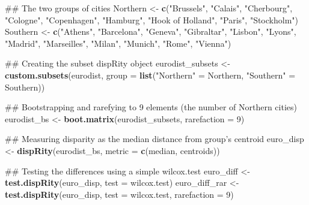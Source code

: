 \documentclass[]{book}
\newenvironment{Shaded}{\begin{snugshade}}{\end{snugshade}}
\newcommand{\KeywordTok}[1]{\textcolor[rgb]{0.13,0.29,0.53}{\textbf{#1}}}
\newcommand{\DataTypeTok}[1]{\textcolor[rgb]{0.13,0.29,0.53}{#1}}
\newcommand{\DecValTok}[1]{\textcolor[rgb]{0.00,0.00,0.81}{#1}}
\newcommand{\StringTok}[1]{\textcolor[rgb]{0.31,0.60,0.02}{#1}}
\newcommand{\NormalTok}[1]{#1}
\theoremstyle{definition}
\theoremstyle{definition}
\theoremstyle{definition}
\theoremstyle{remark}
\begin{document}
\begin{Shaded}
\begin{Highlighting}[]
\NormalTok{## The two groups of cities}
\NormalTok{Northern <-}\StringTok{ }\KeywordTok{c}\NormalTok{(}\StringTok{"Brussels"}\NormalTok{, }\StringTok{"Calais"}\NormalTok{, }\StringTok{"Cherbourg"}\NormalTok{, }\StringTok{"Cologne"}\NormalTok{, }\StringTok{"Copenhagen"}\NormalTok{,}
              \StringTok{"Hamburg"}\NormalTok{, }\StringTok{"Hook of Holland"}\NormalTok{, }\StringTok{"Paris"}\NormalTok{, }\StringTok{"Stockholm"}\NormalTok{)}
\NormalTok{Southern <-}\StringTok{ }\KeywordTok{c}\NormalTok{(}\StringTok{"Athens"}\NormalTok{, }\StringTok{"Barcelona"}\NormalTok{, }\StringTok{"Geneva"}\NormalTok{, }\StringTok{"Gibraltar"}\NormalTok{, }\StringTok{"Lisbon"}\NormalTok{, }\StringTok{"Lyons"}\NormalTok{,}
              \StringTok{"Madrid"}\NormalTok{, }\StringTok{"Marseilles"}\NormalTok{, }\StringTok{"Milan"}\NormalTok{, }\StringTok{"Munich"}\NormalTok{, }\StringTok{"Rome"}\NormalTok{, }\StringTok{"Vienna"}\NormalTok{)}

\NormalTok{## Creating the subset dispRity object}
\NormalTok{eurodist_subsets <-}\StringTok{ }\KeywordTok{custom.subsets}\NormalTok{(eurodist, }\DataTypeTok{group =} \KeywordTok{list}\NormalTok{(}\StringTok{"Northern"}\NormalTok{ =}\StringTok{ }\NormalTok{Northern,}
                                                        \StringTok{"Southern"}\NormalTok{ =}\StringTok{ }\NormalTok{Southern))}

\NormalTok{## Bootstrapping and rarefying to 9 elements (the number of Northern cities)}
\NormalTok{eurodist_bs <-}\StringTok{ }\KeywordTok{boot.matrix}\NormalTok{(eurodist_subsets, }\DataTypeTok{rarefaction =} \DecValTok{9}\NormalTok{)}

\NormalTok{## Measuring disparity as the median distance from group's centroid}
\NormalTok{euro_disp <-}\StringTok{ }\KeywordTok{dispRity}\NormalTok{(eurodist_bs, }\DataTypeTok{metric =} \KeywordTok{c}\NormalTok{(median, centroids))}

\NormalTok{## Testing the differences using a simple wilcox.test}
\NormalTok{euro_diff <-}\StringTok{ }\KeywordTok{test.dispRity}\NormalTok{(euro_disp, }\DataTypeTok{test =}\NormalTok{ wilcox.test)}
\NormalTok{euro_diff_rar <-}\StringTok{ }\KeywordTok{test.dispRity}\NormalTok{(euro_disp, }\DataTypeTok{test =}\NormalTok{ wilcox.test, }\DataTypeTok{rarefaction =} \DecValTok{9}\NormalTok{)}
\end{Highlighting}
\end{Shaded}
\end{document}
